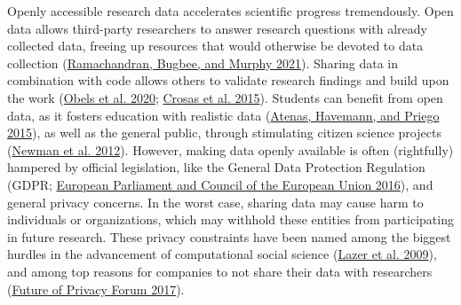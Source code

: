 \documentclass[
]{article}
\begin{document}
Openly accessible research data accelerates scientific progress
tremendously. Open data allows third-party researchers to answer
research questions with already collected data, freeing up resources
that would otherwise be devoted to data collection
(\protect\hyperlink{ref-ramachandran_open_2021}{Ramachandran, Bugbee,
and Murphy 2021}). Sharing data in combination with code allows others
to validate research findings and build upon the work
(\protect\hyperlink{ref-obels_analysis_2020}{Obels et al. 2020};
\protect\hyperlink{ref-crosas_automating_2015}{Crosas et al. 2015}).
Students can benefit from open data, as it fosters education with
realistic data (\protect\hyperlink{ref-atenas_open_2015}{Atenas,
Havemann, and Priego 2015}), as well as the general public, through
stimulating citizen science projects
(\protect\hyperlink{ref-newman_future_2012}{Newman et al. 2012}).
However, making data openly available is often (rightfully) hampered by
official legislation, like the General Data Protection Regulation (GDPR;
\protect\hyperlink{ref-gdpr}{European Parliament and Council of the
European Union 2016}), and general privacy concerns. In the worst case,
sharing data may cause harm to individuals or organizations, which may
withhold these entities from participating in future research. These
privacy constraints have been named among the biggest hurdles in the
advancement of computational social science
(\protect\hyperlink{ref-lazer_css_2009}{Lazer et al. 2009}), and among
top reasons for companies to not share their data with researchers
(\protect\hyperlink{ref-fpf_2017}{Future of Privacy Forum 2017}).
\end{document}
